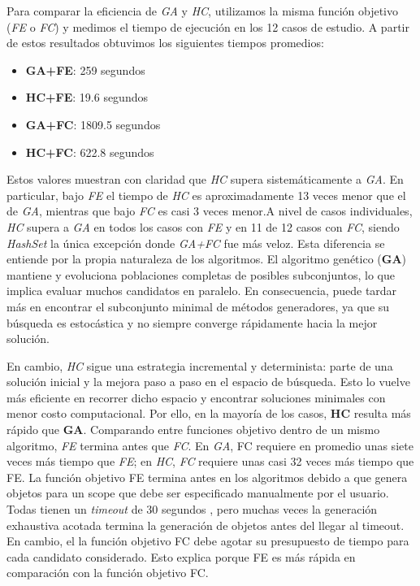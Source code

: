 Para comparar la eficiencia de \emph{GA} y \emph{HC}, utilizamos la misma 
función objetivo (\emph{FE} o \emph{FC}) y medimos el tiempo de ejecución 
en los 12 casos de estudio. A partir de estos resultados obtuvimos los siguientes 
tiempos promedios:

\begin{itemize}
  \item \textbf{GA+FE}: 259 segundos
  \item \textbf{HC+FE}: 19.6 segundos
  \item \textbf{GA+FC}: 1809.5 segundos
  \item \textbf{HC+FC}: 622.8 segundos
\end{itemize}

Estos valores muestran con claridad que \emph{HC} supera sistemáticamente a 
\emph{GA}. En particular, bajo \emph{FE} el tiempo de \emph{HC} es 
aproximadamente 13 veces menor que el de \emph{GA}, mientras que bajo 
\emph{FC} es casi 3 veces menor.A nivel de casos
individuales, \emph{HC} supera a \emph{GA} en todos los casos con \emph{FE} y en 11 de 12 casos con \emph{FC},
siendo \emph{HashSet} la única excepción donde \emph{GA+FC} fue más veloz. 
Esta diferencia se entiende por la propia naturaleza de los algoritmos.
El algoritmo genético (\textbf{GA}) mantiene y evoluciona poblaciones completas de posibles subconjuntos, lo que implica evaluar muchos candidatos en paralelo.
En consecuencia, puede tardar más en encontrar el subconjunto minimal de métodos generadores, ya que su búsqueda es estocástica y no siempre converge rápidamente hacia la mejor solución.

En cambio, \emph{HC} sigue una estrategia incremental y determinista: parte de una solución inicial y la mejora paso a paso en el espacio de búsqueda. Esto lo vuelve más eficiente en recorrer dicho espacio y encontrar soluciones minimales con menor costo computacional. Por ello, en la mayoría de los casos, \textbf{HC} resulta más rápido que \textbf{GA}.
Comparando entre funciones objetivo dentro de un mismo algoritmo, \emph{FE}
termina antes que \emph{FC}. En \emph{GA}, FC requiere en promedio
unas siete veces más tiempo que \emph{FE}; en \emph{HC}, \emph{FC} requiere unas casi 32 veces
más tiempo que FE. La función objetivo FE termina antes en los algoritmos debido a que genera objetos 
para un scope que debe ser especificado manualmente por el usuario. Todas tienen un \emph{timeout} de 
30 segundos , pero muchas veces
la generación exhaustiva acotada termina la generación de objetos antes del llegar al timeout. En cambio, el la función objetivo FC debe agotar su presupuesto de tiempo
para cada candidato considerado.
Esto explica porque FE es más rápida en comparación con la función objetivo FC.

